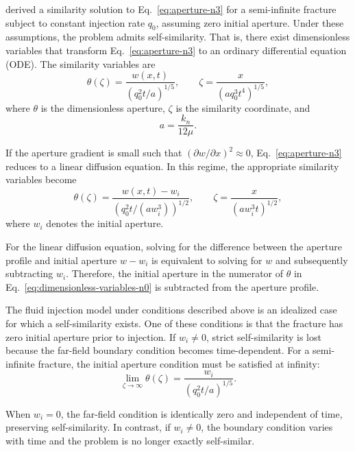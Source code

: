 \documentclass[draft]{agujournal2019}
\begin{document}
 derived a similarity solution to Eq.~\ref{eq:aperture-n3} for a semi-infinite fracture subject to constant injection rate $q_0$, assuming zero initial aperture. Under these assumptions, the problem admits self-similarity. That is, there exist dimensionless variables that transform Eq.~\ref{eq:aperture-n3} to an ordinary differential equation (ODE). The similarity variables are
\begin{equation}
	\theta(\zeta) = \frac{w(x,t)}{(q_0^2 t / a)^{1/5}},
	\qquad
	\zeta = \frac{x}{(a q_0^3 t^4)^{1/5}},
	\label{eq:dimensionless-variables-n3}
\end{equation}
where $\theta$ is the dimensionless aperture, $\zeta$ is the similarity coordinate, and 
\[
a = \frac{k_n}{12\mu}.
\]

If the aperture gradient is small such that $\left(\partial w / \partial x\right)^2 \approx 0$, Eq.~\ref{eq:aperture-n3} reduces to a linear diffusion equation. In this regime, the appropriate similarity variables become
\begin{equation}
	\theta(\zeta) = 
	\frac{w(x,t)-w_i}{\left(q_0^2 t / (a w_i^3)\right)^{1/2}},
	\qquad
	\zeta = \frac{x}{(a w_i^3 t)^{1/2}},
	\label{eq:dimensionless-variables-n0}
\end{equation}
where $w_i$ denotes the initial aperture.

For the linear diffusion equation, solving for the difference between the aperture profile and initial aperture $w-w_i$ is equivalent to solving for $w$ and subsequently subtracting $w_i$. Therefore, the initial aperture in the numerator of $\theta$ in Eq.~\ref{eq:dimensionless-variables-n0} is subtracted from the aperture profile.

The fluid injection model under conditions described above is an idealized case for which a self-similarity exists. One of these conditions is that the fracture has zero initial aperture prior to injection. If $w_i \neq 0$, strict self-similarity is lost because the far-field boundary condition becomes time-dependent. For a semi-infinite fracture, the initial aperture condition must be satisfied at infinity:
\begin{equation}
	\lim_{\zeta \to \infty} \theta(\zeta) 
	= \frac{w_i}{(q_0^2 t / a)^{1/5}}.
	\label{eq:initial-aperture-boundary-condition}
\end{equation}

When $w_i = 0$, the far-field condition is identically zero and independent of time, preserving self-similarity. In contrast, if $w_i \neq 0$, the boundary condition varies with time and the problem is no longer exactly self-similar.
\end{document}
